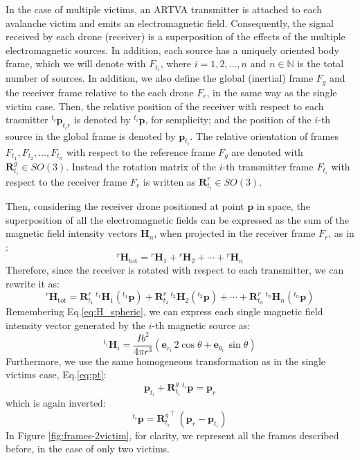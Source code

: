 In the case of multiple victims, an ARTVA transmitter is attached to each
avalanche victim and emits an electromagnetic field. Consequently, the signal received 
by each drone (receiver) is a superposition of the effects of the multiple 
electromagnetic sources. In addition, each source has a uniquely oriented
body frame, which we will denote with $ F_{t_i}$, 
where \( i = 1, 2, \dots, n \) and \( n \in \mathbb{N} \) is the total number of sources.
In addition, we also define the global (inertial) frame $F_g$ and the receiver frame relative to the
each drone $F_r$, in the same way as the single victim case.
Then, the relative position of the receiver with respect to each trasmitter 
${}^{t_i} \mathbf{p}_{{t_i}r}$ is denoted by ${}^{t_i} \mathbf{p}$, for semplicity;
and the position of the $i$-th source in the global frame is denoted by 
$\mathbf{p}_{t_i}$.
The relative orientation of frames $F_{t_1}, F_{t_2}, \dots, F_{t_n}$ with respect to 
the reference frame $F_g$ are denoted with $\mathbf{R}^g_{t_i} \in \textit{SO}(3)$.
Instead the rotation matrix of the $i$-th transmitter frame $F_{t_i}$ with respect to the receiver
frame $F_r$ is written as $\mathbf{R}^r_{t_i} \in \textit{SO}(3)$.

Then, considering the receiver drone positioned at point $\mathbf{p}$ in space, the superposition
of all the electromagnetic fields can be expressed 
as the sum of the magnetic field intensity vectors \(\mathbf{H}_n\), 
when projected in the receiver frame $F_r$, as in \cite{multiple_spacecraft}:
\begin{equation}
    {}^r \mathbf{H}_{\text{tot}} = 
    {}^r \mathbf{H}_1 + {}^r \mathbf{H}_2 + \cdots + {}^r \mathbf{H}_n 
    \label{eq:sum_H}
\end{equation}
Therefore, since the receiver is rotated with respect to each transmitter, we can rewrite it as:
\begin{equation}
    {}^r \mathbf{H}_{\text{tot}} = 
    \mathbf{R}^r_{t_1} \, {}^{t_1} \mathbf{H}_1({}^{t_1} \mathbf{p}) + \mathbf{R}^r_{t_2} \, {}^{t_2} \mathbf{H}_2({}^{t_2} \mathbf{p}) + \cdots + \mathbf{R}^r_{t_n} \, {}^{t_n} \mathbf{H}_n({}^{t_n} \mathbf{p})
\label{eq:sum_H_rotated}
\end{equation}
Remembering Eq.\ref{eq:H_spheric}, we can express each single magnetic field intensity vector generated
by the \(i\)-th magnetic source as:
\[
{}^{t_i} \mathbf{H}_i = \frac{I b^2}{4\pi r^3} \left( \mathbf{e}_{r_i} \, 2 \cos \theta + \mathbf{e}_{\theta_i} \, \sin \theta \right)
\]
Furthermore, we use the same homogeneous transformation as in the single victims case, Eq.\ref{eq:pt}:
\begin{equation}
    \mathbf{p}_{t_i} + \mathbf{R}^g_{t_i} \, {}^{t_i} \mathbf{p} = \mathbf{p}_r
    \label{eq:pt_multi}  
\end{equation}
which is again inverted:
\begin{equation}
    {}^{t_i} \mathbf{p} = {\mathbf{R}^g_{t_i}}^\top \, \left( \mathbf{p}_r - \mathbf{p}_{t_i} \right)
    \label{eq:pt_transmitter}
\end{equation}
In Figure \ref{fig:frames-2victim}, for clarity, we represent all the frames described before, 
in the case of only two victims.
 

